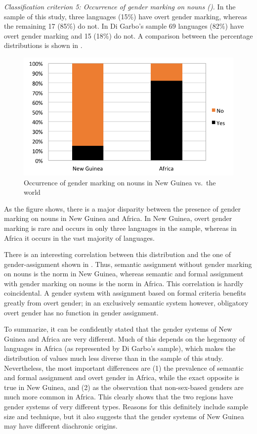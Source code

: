 \documentclass[output=collectionpaper]{langsci/langscibook}
\begin{document}
\textit{Classification criterion 5: Occurrence of gender marking on nouns ().} In the sample of this study, three languages (15\%) have overt gender marking, whereas the remaining 17 (85\%) do not. In Di Garbo's sample 69 languages (82\%) have overt gender marking and 15 (18\%) do not. A comparison between the percentage distributions is shown in .


\begin{figure}
\includegraphics[width=\textwidth]{figures/09/fig11.png}
\caption{Occurrence of gender marking on nouns in New Guinea vs.\ the world}
\label{fig:Svard:11}
\end{figure}

As the figure shows, there is a major disparity between the presence of gender marking on nouns in New Guinea and Africa. In New Guinea, overt gender marking is rare and occurs in only three languages in the sample, whereas in Africa it occurs in the vast majority of languages.

There is an interesting correlation between this distribution and the one of gender-assignment shown in . Thus, semantic assignment without gender marking on nouns is the norm in New Guinea, whereas semantic and formal assignment with gender marking on nouns is the norm in Africa. This correlation is hardly coincidental. A gender system with assignment based on formal criteria benefits greatly from overt gender; in an exclusively semantic system however, obligatory overt gender has no function in gender assignment.

To summarize, it can be confidently stated that the gender systems of New Guinea and Africa are very different. Much of this depends on the hegemony of  languages in Africa (as represented by Di Garbo's sample), which makes the distribution of values much less diverse than in the sample of this study. Nevertheless, the most important differences are (1) the prevalence of semantic and formal assignment and overt gender in Africa, while the exact opposite is true in New Guinea, and (2) as the observation that non-sex-based genders are much more common in Africa. This clearly shows that the two regions have gender systems of very different types. Reasons for this definitely include sample size and technique, but it also suggests that the gender systems of New Guinea may have different diachronic origins.
\end{document}
